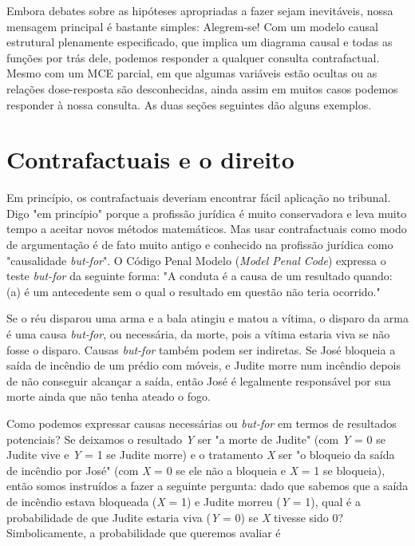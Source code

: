 \documentclass[11pt,a5paper,twoside]{book}
\begin{document}
Embora debates sobre as hipóteses apropriadas a fazer sejam inevitáveis, nossa mensagem principal é bastante simples: Alegrem-se! Com um modelo causal estrutural plenamente especificado, que implica um diagrama causal e todas as funções por trás dele, podemos responder a qualquer consulta contrafactual. Mesmo com um MCE parcial, em que algumas variáveis estão ocultas ou as relações dose-resposta são desconhecidas, ainda assim em muitos casos podemos responder à nossa consulta. As duas seções seguintes dão alguns exemplos.

\section{Contrafactuais e o direito}
Em princípio, os contrafactuais deveriam encontrar fácil aplicação no tribunal. Digo "em princípio" porque a profissão jurídica é muito conservadora e leva muito tempo a aceitar novos métodos matemáticos. Mas usar contrafactuais como modo de argumentação é de fato muito antigo e conhecido na profissão jurídica como "causalidade \textit{but-for}". O Código Penal Modelo (\textit{Model Penal Code}) expressa o teste \textit{but-for} da seguinte forma: "A conduta é a causa de um resultado quando: (a) é um antecedente sem o qual o resultado em questão não teria ocorrido."

Se o réu disparou uma arma e a bala atingiu e matou a vítima, o disparo da arma é uma causa \textit{but-for}, ou necessária, da morte, pois a vítima estaria viva se não fosse o disparo. Causas \textit{but-for} também podem ser indiretas. Se José bloqueia a saída de incêndio de um prédio com móveis, e Judite morre num incêndio depois de não conseguir alcançar a saída, então José é legalmente responsável por sua morte ainda que não tenha ateado o fogo.

Como podemos expressar causas necessárias ou \textit{but-for} em termos de resultados potenciais? Se deixamos o resultado \textit{Y} ser "a morte de Judite" (com \textit{Y} = 0 se Judite vive e \textit{Y} = 1 se Judite morre) e o tratamento \textit{X} ser "o bloqueio da saída de incêndio por José" (com \textit{X} = 0 se ele não a bloqueia e \textit{X} = 1 se bloqueia), então somos instruídos a fazer a seguinte pergunta: dado que sabemos que a saída de incêndio estava bloqueada (\textit{X} = 1) e Judite morreu (\textit{Y} = 1), qual é a probabilidade de que Judite estaria viva (\textit{Y} = 0) se \textit{X} tivesse sido 0? Simbolicamente, a probabilidade que queremos avaliar é
\end{document}
